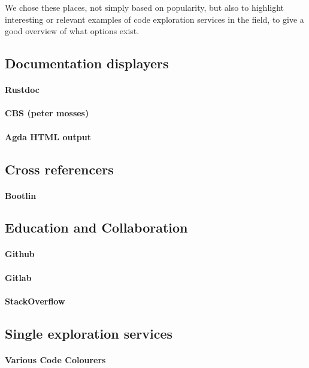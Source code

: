 We chose these places, not simply based on popularity, but also to highlight interesting or relevant examples of code exploration services in
the field, to give a good overview of what options exist.

\subsection{Documentation displayers}
\paragraph{Rustdoc}
\paragraph{CBS (peter mosses)}
\paragraph{Agda HTML output}

\subsection{Cross referencers}
\paragraph{Bootlin}

\subsection{Education and Collaboration}
\paragraph{Github}
\paragraph{Gitlab}
\paragraph{StackOverflow}

\subsection{Single exploration services}
\paragraph{Various Code Colourers}

